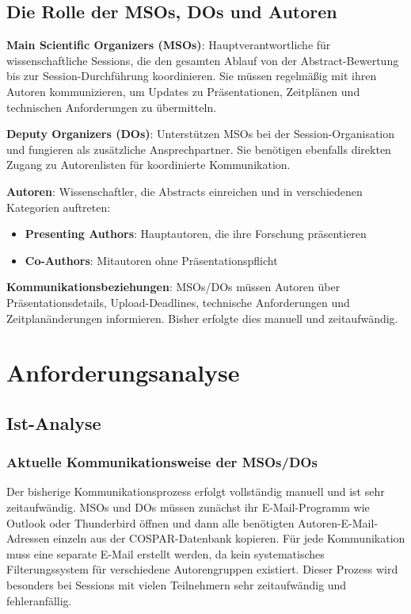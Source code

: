 \documentclass[11pt,a4paper]{article}
\begin{document}
\subsection{Die Rolle der MSOs, DOs und Autoren}
\textbf{Main Scientific Organizers (MSOs)}: Hauptverantwortliche für wissenschaftliche Sessions, die den gesamten Ablauf von der Abstract-Bewertung bis zur Session-Durchführung koordinieren. Sie müssen regelmäßig mit ihren Autoren kommunizieren, um Updates zu Präsentationen, Zeitplänen und technischen Anforderungen zu übermitteln.

\textbf{Deputy Organizers (DOs)}: Unterstützen MSOs bei der Session-Organisation und fungieren als zusätzliche Ansprechpartner. Sie benötigen ebenfalls direkten Zugang zu Autorenlisten für koordinierte Kommunikation.

\textbf{Autoren}: Wissenschaftler, die Abstracts einreichen und in verschiedenen Kategorien auftreten:
\begin{itemize}
    \item \textbf{Presenting Authors}: Hauptautoren, die ihre Forschung präsentieren
    \item \textbf{Co-Authors}: Mitautoren ohne Präsentationspflicht
\end{itemize}

\textbf{Kommunikationsbeziehungen}: MSOs/DOs müssen Autoren über Präsentationsdetails, Upload-Deadlines, technische Anforderungen und Zeitplanänderungen informieren. Bisher erfolgte dies manuell und zeitaufwändig.

\newpage

\section{Anforderungsanalyse}

\subsection{Ist-Analyse}

\subsubsection{Aktuelle Kommunikationsweise der MSOs/DOs}
Der bisherige Kommunikationsprozess erfolgt vollständig manuell und ist sehr zeitaufwändig. MSOs und DOs müssen zunächst ihr E-Mail-Programm wie Outlook oder Thunderbird öffnen und dann alle benötigten Autoren-E-Mail-Adressen einzeln aus der COSPAR-Datenbank kopieren. Für jede Kommunikation muss eine separate E-Mail erstellt werden, da kein systematisches Filterungssystem für verschiedene Autorengruppen existiert. Dieser Prozess wird besonders bei Sessions mit vielen Teilnehmern sehr zeitaufwändig und fehleranfällig.
\end{document}
